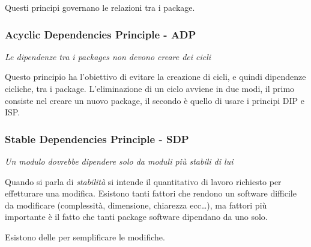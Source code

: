 {    \newpage
    Questi principi governano le relazioni tra i package.
    \subsubsection{Acyclic Dependencies Principle - ADP}
    \textit{Le dipendenze tra i packages non devono creare dei cicli}

    Questo principio ha l'obiettivo di evitare la creazione di cicli, e quindi dipendenze cicliche, tra i package.
    L'eliminazione di un ciclo avviene in due modi, il primo consiste nel creare un nuovo package, il secondo è quello di
    usare i principi DIP e ISP.
    
    \subsubsection{Stable Dependencies Principle - SDP}
    \textit{Un modulo dovrebbe dipendere solo da moduli più stabili di lui}
    
    Quando si parla di \textit{stabilità} si intende il quantitativo di lavoro richiesto per effetturare una modifica.
    Esistono tanti fattori che rendono un software difficile da modificare (complessità, dimensione, chiarezza ecc\dots), ma
    fattori più importante è il fatto che tanti package software dipendano da uno solo.
    
    Esistono delle  per semplificare le modifiche.
    \begin{center}
    \end{center}

}
